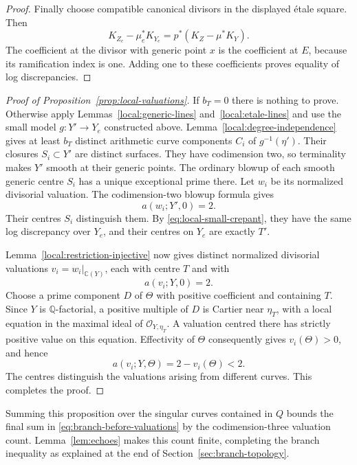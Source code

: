 \begin{proof}
Finally choose compatible canonical divisors in the displayed
\'etale square.  Then
\[
 K_{Z_e}-\mu_e^*K_{Y_e}
       =p^*(K_Z-\mu^*K_Y).
\]
The coefficient at the divisor with generic point $x$ is the
coefficient at $E$, because its ramification index is one.  Adding
one to these coefficients proves equality of log discrepancies.
\end{proof}

\begin{proof}[Proof of Proposition~\ref{prop:local-valuations}]
If $b_T=0$ there is nothing to prove.  Otherwise apply
Lemmas~\ref{local:generic-lines} and~\ref{local:etale-lines} and use
the small model $g:Y'\to Y_e$ constructed above.
Lemma~\ref{local:degree-independence} gives at least $b_T$ distinct
arithmetic curve components $C_i$ of $g^{-1}(\eta')$.  Their closures
$S_i\subset Y'$ are distinct surfaces.  They have codimension two,
so terminality makes $Y'$ smooth at their generic points.  The
ordinary blowup of each smooth generic centre $S_i$ has a unique
exceptional prime there.  Let $w_i$ be its normalized divisorial
valuation.  The codimension-two blowup formula gives
\[
 a(w_i;Y',0)=2.
\]
Their centres $S_i$ distinguish them.  By
\eqref{eq:local-small-crepant}, they have the same log discrepancy
over $Y_e$, and their centres on $Y_e$ are exactly $T'$.

Lemma~\ref{local:restriction-injective} now gives distinct normalized
divisorial valuations
$v_i=w_i|_{\mathbb C(Y)}$, each with centre $T$ and with
\[
 a(v_i;Y,0)=2.
\]
Choose a prime component $D$ of $\Theta$ with positive coefficient
and containing $T$.  Since $Y$ is $\mathbb Q$-factorial, a positive
multiple of $D$ is Cartier near $\eta_T$, with a local equation in
the maximal ideal of $\mathcal O_{Y,\eta_T}$.  A valuation centred
there has strictly positive value on this equation.  Effectivity of
$\Theta$ consequently gives $v_i(\Theta)>0$, and hence
\[
 a(v_i;Y,\Theta)=2-v_i(\Theta)<2.
\]
The centres distinguish the valuations arising from different
curves.  This completes the proof.
\end{proof}

Summing this proposition over the singular curves contained in $Q$
bounds the final sum in \eqref{eq:branch-before-valuations} by the
codimension-three valuation count.  Lemma~\ref{lem:echoes} makes this
count finite, completing the branch inequality as explained at the end
of Section~\ref{sec:branch-topology}.

